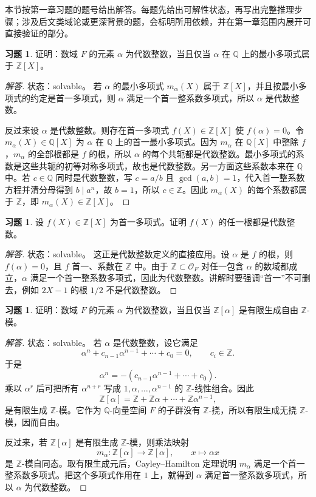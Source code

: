 \documentclass[11pt,a4paper,openany]{ctexbook}
\numberwithin{equation}{chapter}
\newcommand{\Q}{\mathbb{Q}}
\newcommand{\Z}{\mathbb{Z}}
\theoremstyle{plain}
\theoremstyle{definition}
\newtheorem{exercise}[theorem]{习题}
\theoremstyle{remark}
\begin{document}
本节按第一章习题的题号给出解答。每题先给出可解性状态，再写出完整推理步骤；涉及后文类域论或更深背景的题，会标明所用依赖，并在第一章范围内展开可直接验证的部分。

\begin{exercise}
证明：数域 $F$ 的元素 $\alpha$ 为代数整数，当且仅当 $\alpha$ 在 $\Q$ 上的最小多项式属于 $\Z[X]$。
\end{exercise}

\begin{proof}[解答]
状态：solvable。
若 $\alpha$ 的最小多项式 $m_\alpha(X)$ 属于 $\Z[X]$，并且按最小多项式的约定是首一多项式，则 $\alpha$ 满足一个首一整系数多项式，所以 $\alpha$ 是代数整数。

反过来设 $\alpha$ 是代数整数。则存在首一多项式 $f(X)\in\Z[X]$ 使 $f(\alpha)=0$。令 $m_\alpha(X)\in\Q[X]$ 为 $\alpha$ 在 $\Q$ 上的首一最小多项式。因为 $m_\alpha$ 在 $\Q[X]$ 中整除 $f$，$m_\alpha$ 的全部根都是 $f$ 的根，所以 $\alpha$ 的每个共轭都是代数整数。最小多项式的系数是这些共轭的初等对称多项式，故也是代数整数。另一方面这些系数本来在 $\Q$ 中。若 $c\in\Q$ 同时是代数整数，写 $c=a/b$ 且 $\gcd(a,b)=1$，代入首一整系数方程并清分母得到 $b\mid a^n$，故 $b=1$，所以 $c\in\Z$。因此 $m_\alpha(X)$ 的每个系数都属于 $\Z$，即 $m_\alpha(X)\in\Z[X]$。
\end{proof}

\begin{exercise}
设 $f(X)\in\Z[X]$ 为首一多项式。证明 $f(X)$ 的任一根都是代数整数。
\end{exercise}

\begin{proof}[解答]
状态：solvable。
这正是代数整数定义的直接应用。设 $\alpha$ 是 $f$ 的根，则 $f(\alpha)=0$，且 $f$ 首一、系数在 $\Z$ 中。由于 $\Z\subset\mathcal O_F$ 对任一包含 $\alpha$ 的数域都成立，$\alpha$ 满足一个首一整系数多项式，因此为代数整数。讲解时要强调“首一”不可删去，例如 $2X-1$ 的根 $1/2$ 不是代数整数。
\end{proof}

\begin{exercise}
证明：数域 $F$ 的元素 $\alpha$ 为代数整数，当且仅当 $\Z[\alpha]$ 是有限生成自由 $\Z$-模。
\end{exercise}

\begin{proof}[解答]
状态：solvable。
若 $\alpha$ 是代数整数，设它满足
\[
\alpha^n+c_{n-1}\alpha^{n-1}+\cdots+c_0=0,\qquad c_i\in\Z.
\]
于是
\[
\alpha^n=-(c_{n-1}\alpha^{n-1}+\cdots+c_0).
\]
乘以 $\alpha^r$ 后可把所有 $\alpha^{n+r}$ 写成 $1,\alpha,\dots,\alpha^{n-1}$ 的 $\Z$-线性组合。因此
\[
\Z[\alpha]=\Z+\Z\alpha+\cdots+\Z\alpha^{n-1},
\]
是有限生成 $\Z$-模。它作为 $\Q$-向量空间 $F$ 的子群没有 $\Z$-挠，所以有限生成无挠 $\Z$-模，因而自由。

反过来，若 $\Z[\alpha]$ 是有限生成 $\Z$-模，则乘法映射
\[
m_\alpha:\Z[\alpha]\to\Z[\alpha],\qquad x\mapsto\alpha x
\]
是 $\Z$-模自同态。取有限生成元后，Cayley--Hamilton 定理说明 $m_\alpha$ 满足一个首一整系数多项式。把这个多项式作用在 $1$ 上，就得到 $\alpha$ 满足首一整系数多项式，所以 $\alpha$ 为代数整数。
\end{proof}
\end{document}

